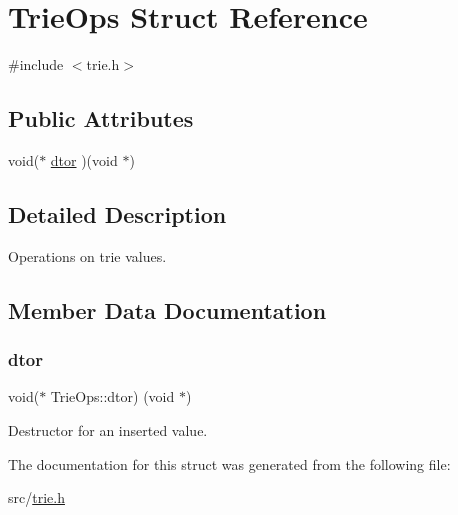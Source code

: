 \hypertarget{structTrieOps}{}\section{Trie\+Ops Struct Reference}
\label{structTrieOps}


{\ttfamily \#include $<$trie.\+h$>$}

\subsection*{Public Attributes}
\begin{DoxyCompactItemize}
\item 
void($\ast$ \mbox{\hyperlink{structTrieOps_ac0568b096d582ac3deda05509e85ff10}{dtor}} )(void $\ast$)
\end{DoxyCompactItemize}


\subsection{Detailed Description}
Operations on trie values. 

\subsection{Member Data Documentation}
\mbox{\label{structTrieOps_ac0568b096d582ac3deda05509e85ff10}} 
\subsubsection{\texorpdfstring{dtor}{dtor}}
{\footnotesize\ttfamily void($\ast$ Trie\+Ops\+::dtor) (void $\ast$)}

Destructor for an inserted value. 

The documentation for this struct was generated from the following file\+:\begin{DoxyCompactItemize}
\item 
src/\mbox{\hyperlink{trie_8h}{trie.\+h}}\end{DoxyCompactItemize}
